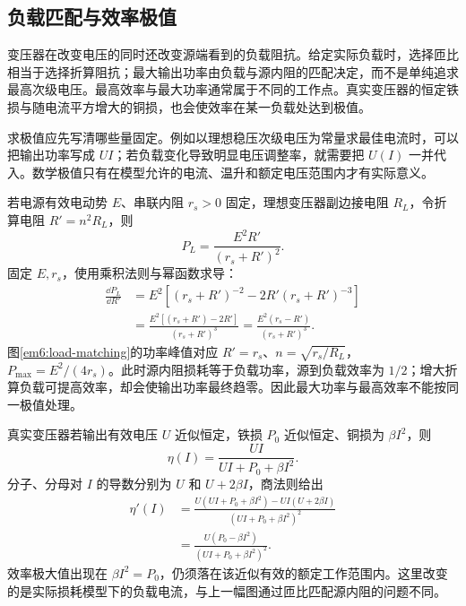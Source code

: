 \subsection{负载匹配与效率极值}

变压器在改变电压的同时还改变源端看到的负载阻抗。给定实际负载时，选择匝比相当于选择折算阻抗；最大输出功率由负载与源内阻的匹配决定，而不是单纯追求最高次级电压。最高效率与最大功率通常属于不同的工作点。真实变压器的恒定铁损与随电流平方增大的铜损，也会使效率在某一负载处达到极值。

求极值应先写清哪些量固定。例如以理想稳压次级电压为常量求最佳电流时，可以把输出功率写成 $UI$；若负载变化导致明显电压调整率，就需要把 $U(I)$ 一并代入。数学极值只有在模型允许的电流、温升和额定电压范围内才有实际意义。


若电源有效电动势 $E$、串联内阻 $r_s>0$ 固定，理想变压器副边接电阻 $R_L$，令折算电阻 $R'=n^2R_L$，则
\[
P_L=\frac{E^2R'}{(r_s+R')^2}.
\]
固定 $E,r_s$，使用乘积法则与幂函数求导：
\begin{align*}
\frac{\dd P_L}{\dd R'}
&=E^2\left[(r_s+R')^{-2}-2R'(r_s+R')^{-3}\right]\\
&=\frac{E^2[(r_s+R')-2R']}{(r_s+R')^3}
=\frac{E^2(r_s-R')}{(r_s+R')^3}.
\end{align*}
图\ref{em6:load-matching}的功率峰值对应 $R'=r_s$、$n=\sqrt{r_s/R_L}$，$P_{\max}=E^2/(4r_s)$。此时源内阻损耗等于负载功率，源到负载效率为 $1/2$；增大折算负载可提高效率，却会使输出功率最终趋零。因此最大功率与最高效率不能按同一极值处理。

真实变压器若输出有效电压 $U$ 近似恒定，铁损 $P_0$ 近似恒定、铜损为 $\beta I^2$，则
\[
\eta(I)=\frac{UI}{UI+P_0+\beta I^2}.
\]
分子、分母对 $I$ 的导数分别为 $U$ 和 $U+2\beta I$，商法则给出
\begin{align*}
\eta'(I)
&=\frac{U(UI+P_0+\beta I^2)-UI(U+2\beta I)}
{(UI+P_0+\beta I^2)^2}\\
&=\frac{U(P_0-\beta I^2)}{(UI+P_0+\beta I^2)^2}.
\end{align*}
效率极大值出现在 $\beta I^2=P_0$，仍须落在该近似有效的额定工作范围内。这里改变的是实际损耗模型下的负载电流，与上一幅图通过匝比匹配源内阻的问题不同。



